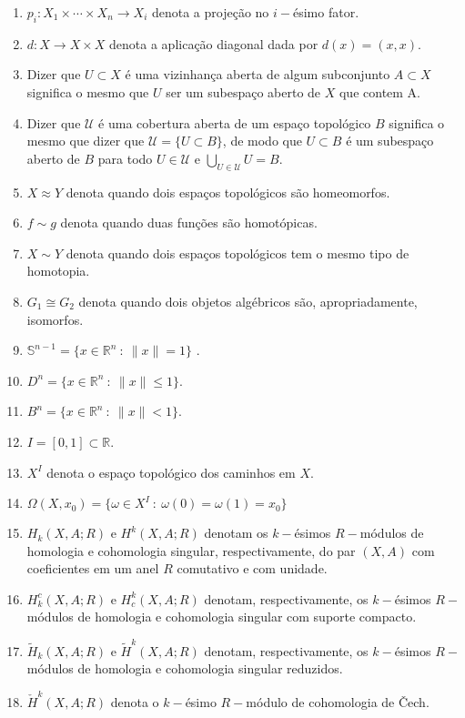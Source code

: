 \documentclass[12pt,oneside]{book}
\newcommand{\ds}{\displaystyle}
\newcommand{\R}{\mathbb{R}}
\newcommand{\wt}{\widetilde}
\begin{document}
\begin{enumerate}
	\item $p_{i}:X_{1}\times \cdots\times X_{n}\to X_{i}$ denota a projeção no $i-$ésimo fator.
	\item $d:X\to X\times X$ denota a aplicação diagonal dada por $d(x)=(x,x)$.
	\item Dizer que $U\subset X$ é uma vizinhança aberta de algum subconjunto $A\subset X$ significa o mesmo que $U$ ser um subespaço aberto de $X$ que contem A.
	\item Dizer que $\mathcal{U}$ é uma cobertura aberta de um espaço topológico $B$ significa o mesmo que dizer que $\mathcal{U}=\{ U\subset B \}$, de modo que $U\subset B$ é um subespaço aberto de $B$ para todo $U\in\mathcal{U}$ e $\ds\bigcup_{U\in\mathcal{U}}U=B$.
	\item $X \approx Y$ denota quando dois espaços topológicos são homeomorfos.
	\item $f \sim g$ denota quando duas funções são homotópicas.
	\item $X\sim Y$ denota quando dois espaços topológicos tem o mesmo tipo de homotopia.
	\item $G_{1}\cong G_{2}$ denota quando dois objetos algébricos são, apropriadamente, isomorfos.
	\item $\mathbb{S}^{n-1}=\{ x\in\R^{n} \ : \ \| x \|=1 \}$ 	.
	\item $D^{n}=\{ x\in\R^{n} \ : \ \| x \|\leq1 \}$.
	\item $B^{n}=\{ x\in\R^{n} \ : \ \| x \|<1 \}$.								
	\item $I=[0,1]\subset \R$.														
	\item $X^{I}$ denota o espaço topológico dos caminhos em $X$.
	\item $\Omega(X,x_{0})=\{ \omega\in X^{I} \ : \ \omega(0)=\omega(1)=x_{0} \}$
	\item $H_{k}(X,A;R)$ e $H^{k}(X,A;R)$ denotam os $k-$ésimos $R-$módulos de homologia e cohomologia singular, respectivamente, do par $(X,A)$ com coeficientes em um anel $R$ comutativo e com unidade.
	\item $H_{k}^{c}(X,A;R)$ e $H^{k}_{c}(X,A;R)$ denotam, respectivamente, os $k-$ésimos $R-$módulos de homologia e cohomologia singular com suporte compacto.
	\item $\wt{H}_{k}(X,A;R)$ e $\wt{H}^{k}(X,A;R)$ denotam, respectivamente, os $k-$ésimos $R-$módulos de homologia e cohomologia singular reduzidos.
	\item $\check{H}^{k}(X,A;R)$ denota o $k-$ésimo $R-$módulo de cohomologia de \v{C}ech.

\end{enumerate}
\end{document}
